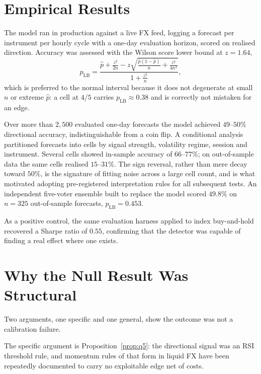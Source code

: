 \documentclass[11pt]{article}
\begin{document}
\section{Empirical Results}
\label{sec:emp}

The model ran in production against a live FX feed, logging a forecast per
instrument per hourly cycle with a one-day evaluation horizon, scored on
realised direction. Accuracy was assessed with the Wilson score lower bound
at $z = 1.64$,
\begin{equation}
p_{\text{LB}} = \frac{\hat{p} + \frac{z^2}{2n}
  - z\sqrt{\frac{\hat{p}(1-\hat{p})}{n} + \frac{z^2}{4n^2}}}
  {1 + \frac{z^2}{n}},
\end{equation}
which is preferred to the normal interval because it does not degenerate at
small $n$ or extreme $\hat p$: a cell at $4/5$ carries $p_{\text{LB}} \approx 0.38$
and is correctly not mistaken for an edge.

Over more than $2{,}500$ evaluated one-day forecasts the model achieved
$49$--$50\%$ directional accuracy, indistinguishable from a coin flip. A
conditional analysis partitioned forecasts into cells by signal strength,
volatility regime, session and instrument. Several cells showed in-sample
accuracy of $66$--$77\%$; on out-of-sample data the same cells realised
$15$--$31\%$. The sign reversal, rather than mere decay toward $50\%$, is
the signature of fitting noise across a large cell count, and is what
motivated adopting pre-registered interpretation rules for all subsequent
tests. An independent five-voter ensemble built to replace the model scored
$49.8\%$ on $n = 325$ out-of-sample forecasts, $p_{\text{LB}} = 0.453$.

As a positive control, the same evaluation harness applied to index
buy-and-hold recovered a Sharpe ratio of $0.55$, confirming that the
detector was capable of finding a real effect where one exists.

\section{Why the Null Result Was Structural}
\label{sec:why}

Two arguments, one specific and one general, show the outcome was not a
calibration failure.

The specific argument is Proposition~\ref{prop:q5}: the directional signal
was an RSI threshold rule, and momentum rules of that form in liquid FX have
been repeatedly documented to carry no exploitable edge net of costs.
\end{document}
